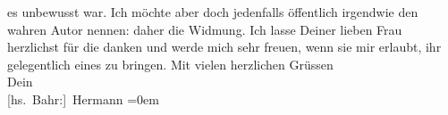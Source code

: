 \begin{ledgroupsized}[t]{13cm}
               es unbewusst war. Ich möchte aber doch jedenfalls öffentlich irgendwie den wahren
               Autor nennen: daher die Widmung.\pend
           \pstart
           Ich lasse Deiner lieben Frau
               herzlichst für die \label{K_L01633_1v}\label{K_L01633_1h} danken und werde mich
               sehr freuen, wenn sie mir erlaubt, ihr gelegentlich eines zu bringen.\pend
           \pstart
           Mit vielen herzlichen Grüssen{\\[\baselineskip]}Dein{\\[\baselineskip]}\spacefill\mbox{{[}hs. Bahr:{]} Hermann}\pend
           \leftskip=0em{}\endnumbering{}\end{ledgroupsized}  \newcommand{\dateiname}{L01633}\newcommand{\titel}{Hermann Bahr an Arthur Schnitzler, 16. 10. 1906}\newcommand{\editorInnen}{ Kurt Ifkovits,  Martin Anton Müller}
      